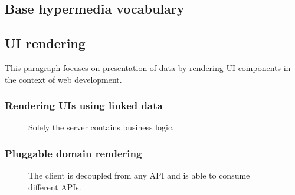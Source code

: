 \subsection{Base hypermedia vocabulary}\label{basevocab}

\subsection{UI rendering}\label{genericrendering}

This paragraph focuses on presentation of data by rendering UI components in the context of web development.

\subsubsection{Rendering UIs using linked data}\label{linkeddatarendering}

\begin{figure}[!htb]
  \caption{\label{fig:my-label} Solely the server contains business logic.}
\end{figure}

\subsubsection{Pluggable domain rendering}\label{domainrendering}

\begin{figure}[!htb]
  \caption{\label{fig:my-label} The client is decoupled from any API and is able to consume different APIs.}
\end{figure}

